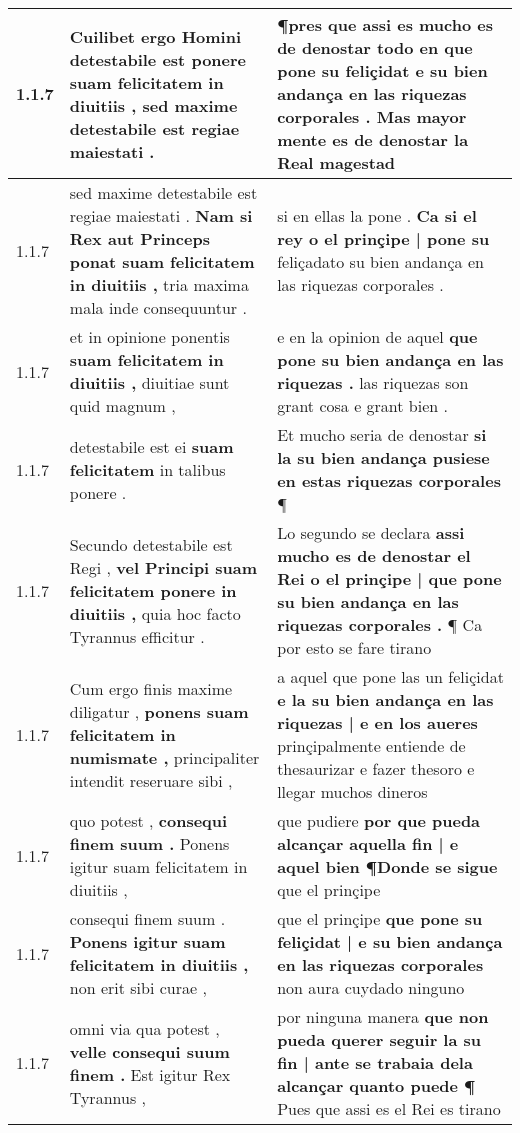 \begin{tabular}{|p{1cm}|p{6.5cm}|p{6.5cm}|}
1.1.7 & Cuilibet ergo Homini detestabile est \textbf{ ponere suam felicitatem in diuitiis , } sed maxime detestabile est regiae maiestati . & ¶pres que assi es mucho es de denostar todo en que pone su feliçidat \textbf{ e su bien andança en las riquezas corporales . } Mas mayor mente es de denostar la Real magestad \\\hline
1.1.7 & sed maxime detestabile est regiae maiestati . \textbf{ Nam si Rex aut Princeps ponat suam felicitatem in diuitiis , } tria maxima mala inde consequuntur . & si en ellas la pone . \textbf{ Ca si el rey o el prinçipe | pone su } feliçadato su bien andança en las riquezas corporales . \\\hline
1.1.7 & et in opinione ponentis \textbf{ suam felicitatem in diuitiis , } diuitiae sunt quid magnum , & e en la opinion de aquel \textbf{ que pone su bien andança en las riquezas . } las riquezas son grant cosa e grant bien . \\\hline
1.1.7 & detestabile est ei \textbf{ suam felicitatem } in talibus ponere . & Et mucho seria de denostar \textbf{ si la su bien andança pusiese en estas riquezas corporales } ¶ \\\hline
1.1.7 & Secundo detestabile est Regi , \textbf{ vel Principi suam felicitatem ponere in diuitiis , } quia hoc facto Tyrannus efficitur . & Lo segundo se declara \textbf{ assi mucho es de denostar el Rei o el prinçipe | que pone su bien andança en las riquezas corporales . } ¶ Ca por esto se fare tirano \\\hline
1.1.7 & Cum ergo finis maxime diligatur , \textbf{ ponens suam felicitatem in numismate , } principaliter intendit reseruare sibi , & a aquel que pone las un feliçidat \textbf{ e la su bien andança en las riquezas | e en los aueres } prinçipalmente entiende de thesaurizar e fazer thesoro e llegar muchos dineros \\\hline
1.1.7 & quo potest , \textbf{ consequi finem suum . } Ponens igitur suam felicitatem in diuitiis , & que pudiere \textbf{ por que pueda alcançar aquella fin | e aquel bien ¶Donde se sigue } que el prinçipe \\\hline
1.1.7 & consequi finem suum . \textbf{ Ponens igitur suam felicitatem in diuitiis , } non erit sibi curae , & que el prinçipe \textbf{ que pone su feliçidat | e su bien andança en las riquezas corporales } non aura cuydado ninguno \\\hline
1.1.7 & omni via qua potest , \textbf{ velle consequi suum finem . } Est igitur Rex Tyrannus , & por ninguna manera \textbf{ que non pueda querer seguir la su fin | ante se trabaia dela alcançar quanto puede ¶ } Pues que assi es el Rei es tirano \\\hline

\end{tabular}
